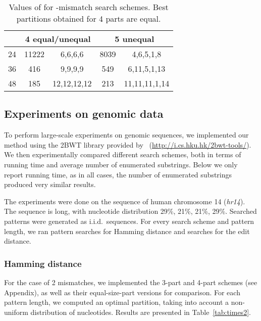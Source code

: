 \documentclass[12pt]{article}
\begin{document}
\begin{table}[!tb]
\caption{Values of  for -mismatch
search schemes. Best partitions obtained for 4 parts are equal.\label{tab:k3}}
\centering
\begin{tabular}{|c|c|c|c|c|}
\hline
 & \multicolumn{2}{|c|}{4 equal/unequal} & \multicolumn{2}{|c|}{5 unequal} \\
\hline
24 & 11222 & 6,6,6,6 &  8039 & 4,6,5,1,8 \\
36 &   416 & 9,9,9,9 &   549 & 6,11,5,1,13 \\
48 &   185 & 12,12,12,12 &   213 & 11,11,11,1,14 \\
\hline
\end{tabular}
\end{table}

\subsection{Experiments on genomic data}\label{subsec:experimentpract}

To perform large-scale experiments on genomic sequences, we
implemented our method using the {\sc 2BWT} library
provided by~\cite{LamLTWWY09}
(\url{http://i.cs.hku.hk/2bwt-tools/}). We then experimentally compared
different search schemes, both in terms of running time and average
number of enumerated substrings. Below we only report 
running time, as in all cases, the number of enumerated substrings
produced very similar results. 

\begin{sloppypar}
The experiments were done on the sequence of human chromosome
14 (\emph{hr14}). The sequence is  long, with nucleotide distribution
29\%, 21\%, 21\%, 29\%.
Searched patterns were generated as i.i.d.\ sequences. For every search
scheme and pattern length, we ran  pattern searches for Hamming distance
and  searches for the edit distance.
\end{sloppypar}

\subsubsection{Hamming distance}

For the case of 2 mismatches, we implemented the 3-part and 4-part schemes
(see Appendix), as well as their equal-size-part
versions for comparison. For each pattern length, we computed an
optimal partition, taking into account a non-uniform distribution of
nucleotides. Results are presented in Table~\ref{tab:times2}.
\end{document}
